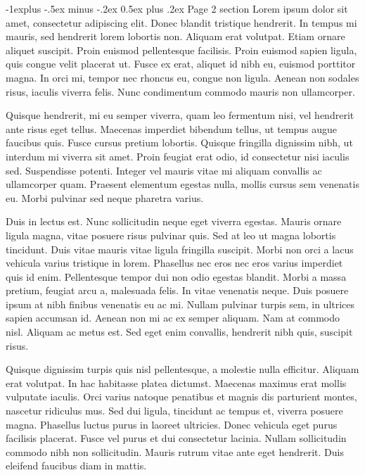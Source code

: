 \documentclass[10pt,landscape]{article}
\makeatletter
\renewcommand{\subsection}{\@startsection{subsection}{2}{0mm}%
    {-1explus -.5ex minus -.2ex}%
    {0.5ex plus .2ex}%
    {\normalfont\normalsize\bfseries}}
\makeatother
\begin{document}
\begin{multicols}{3}
\subsection{Page 2 section}
Lorem ipsum dolor sit amet, consectetur adipiscing elit. Donec blandit
tristique hendrerit. In tempus mi mauris, sed hendrerit lorem lobortis
non. Aliquam erat volutpat. Etiam ornare aliquet suscipit. Proin
euismod pellentesque facilisis. Proin euismod sapien ligula, quis
congue velit placerat ut. Fusce ex erat, aliquet id nibh eu, euismod
porttitor magna. In orci mi, tempor nec rhoncus eu, congue non
ligula. Aenean non sodales risus, iaculis viverra felis. Nunc
condimentum commodo mauris non ullamcorper.

Quisque hendrerit, mi eu semper viverra, quam leo fermentum nisi, vel
hendrerit ante risus eget tellus. Maecenas imperdiet bibendum tellus,
ut tempus augue faucibus quis. Fusce cursus pretium lobortis. Quisque
fringilla dignissim nibh, ut interdum mi viverra sit amet. Proin
feugiat erat odio, id consectetur nisi iaculis sed. Suspendisse
potenti. Integer vel mauris vitae mi aliquam convallis ac ullamcorper
quam. Praesent elementum egestas nulla, mollis cursus sem venenatis
eu. Morbi pulvinar sed neque pharetra varius.

Duis in lectus est. Nunc sollicitudin neque eget viverra
egestas. Mauris ornare ligula magna, vitae posuere risus pulvinar
quis. Sed at leo ut magna lobortis tincidunt. Duis vitae mauris vitae
ligula fringilla suscipit. Morbi non orci a lacus vehicula varius
tristique in lorem. Phasellus nec eros nec eros varius imperdiet quis
id enim. Pellentesque tempor dui non odio egestas blandit. Morbi a
massa pretium, feugiat arcu a, malesuada felis. In vitae venenatis
neque. Duis posuere ipsum at nibh finibus venenatis eu ac mi. Nullam
pulvinar turpis sem, in ultrices sapien accumsan id. Aenean non mi ac
ex semper aliquam. Nam at commodo nisl. Aliquam ac metus est. Sed eget
enim convallis, hendrerit nibh quis, suscipit risus.

Quisque dignissim turpis quis nisl pellentesque, a molestie nulla
efficitur. Aliquam erat volutpat. In hac habitasse platea
dictumst. Maecenas maximus erat mollis vulputate iaculis. Orci varius
natoque penatibus et magnis dis parturient montes, nascetur ridiculus
mus. Sed dui ligula, tincidunt ac tempus et, viverra posuere
magna. Phasellus luctus purus in laoreet ultricies. Donec vehicula
eget purus facilisis placerat. Fusce vel purus et dui consectetur
lacinia. Nullam sollicitudin commodo nibh non sollicitudin. Mauris
rutrum vitae ante eget hendrerit. Duis eleifend faucibus diam in
mattis.


\end{multicols}
\end{document}
